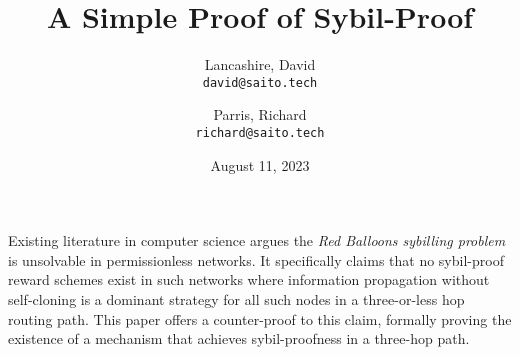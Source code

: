 \documentclass[oneside]{article}   	%
\title{A Simple Proof of Sybil-Proof}
\author{
  Lancashire, David\\
  \texttt{david@saito.tech}
  \and
  Parris, Richard\\
  \texttt{richard@saito.tech}
}
\date{August 11, 2023}
\begin{document}
\maketitle

\begin{onecolabstract}
Existing literature in computer science argues the \textit{Red Balloons sybilling problem} is unsolvable in permissionless networks. It specifically claims that no sybil-proof reward schemes exist in such networks where information propagation without self-cloning is a dominant strategy for all such nodes in a three-or-less hop routing path. This paper offers a counter-proof to this claim, formally proving the existence of a mechanism that achieves sybil-proofness in a three-hop path.
\end{onecolabstract}

\bigskip 
\bigskip 
\end{document}
